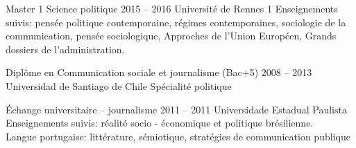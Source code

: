 \documentclass[30pt, french]{tccv}
\begin{document}
\begin{upshape}
\begin{textblock}{21}
\begin{center}
\end{center}
\end{textblock}  





%
%




\begin{education}

\vspace{0.5cm}
\item[Master 1 Science politique]{2015 -- 2016}
     {Université de Rennes 1}
     {Enseignements suivis: pensée politique contemporaine, 
     régimes contemporaines, sociologie de la communication, pensée sociologique, 
     Appro\-ches de l'Union Européen, Grands dossiers de\- l'ad\-mi\-ni\-stra\-tion.}



\vspace{0.5cm}
\item[Diplôme en Communication sociale et journalisme (Bac+5)]{2008 -- 2013}
     {Universidad de Santiago de Chile}
     {Spécialité politique
     }

 \vspace{0.5cm}    
\item[Échange universitaire -- journalisme]{2011 -- 2011}
     {Universidade Estadual Pau\-li\-sta}
     {Enseignements suivis: réalité socio - é\-co\-no\-mi\-que et politique brésilienne. \\
     Langue portugaise: littérature, sémiotique, stra\-té\-gies de communication publique}


\end{education}


%
%


\begin{competence}


\end{competence}
\end{upshape}
\end{document}
